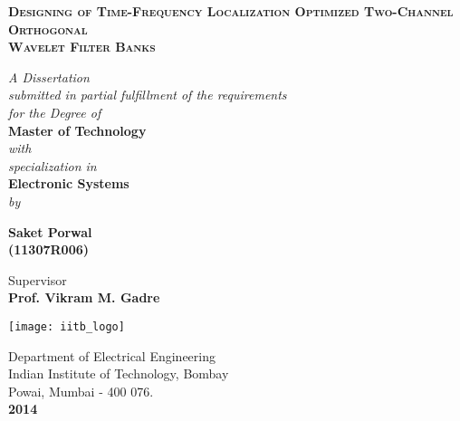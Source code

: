 \begin{center}
\begin{center}
    \Large{\textsc{\textbf{Designing of Time-Frequency Localization Optimized Two-Channel Orthogonal \\Wavelet Filter Banks}}} \\[0.5cm]
\end{center}
    
\vspace{0.5cm}
\textit{A Dissertation}\\
\textit{submitted in partial fulfillment of the requirements\\ for the Degree of} \\
\vspace{0.5cm} 
\textbf{Master of Technology}\\
\vspace{0.5cm}
 \textit{with \\specialization in}\\
 \vspace{0.5cm}
  \textbf{Electronic Systems}\\
\vspace{0.5cm} \textit{by}\\


    \begin{center}
    \textbf{Saket Porwal}\\
    \textbf{(11307R006)}\\
    \end{center}

\vspace{1cm}
Supervisor\\[0.5cm]
{\textbf {Prof. Vikram M. Gadre}}\\[1.5cm]

\begin{center}
\texttt{[image: iitb\_logo]}
\end{center}

Department of Electrical Engineering\\
Indian Institute of Technology, Bombay\\
Powai, Mumbai - 400 076.\\[0.5cm]
\textbf{2014}
\end{center} 